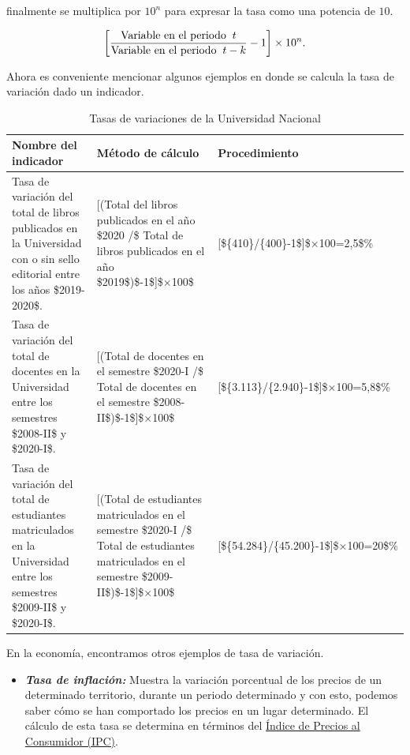 \documentclass[
  11pt,
]{book}
\providecommand{\tightlist}{%
  \setlength{\itemsep}{0pt}\setlength{\parskip}{0pt}}
\begin{document}
finalmente se multiplica por \(10^{n}\) para expresar la tasa como una potencia de \(10\).

\[\begin{equation}
\left[\frac{\text{Variable en el periodo}\hspace{2mm} t}{\text{Variable en el periodo} \hspace{2mm} t-k}-1 \right] \times 10^{n}.
\end{equation}\]

Ahora es conveniente mencionar algunos ejemplos en donde se calcula la tasa de variación dado un indicador.

\begin{table}

\caption{\label{tab:unnamed-chunk-6}Tasas de variaciones de la Universidad Nacional}
\centering
\begin{tabular}[t]{l|l|l}
\hline
Nombre del indicador & Método de cálculo & Procedimiento\\
\hline
Tasa de variación del total de libros publicados en la Universidad con o sin sello editorial entre los años \$2019-2020\$. & [(Total del libros publicados en el año \$2020 /\$ Total de libros publicados en el año \$2019\$)\$-1\$]\$×100\$ & [\$\{410\}/\{400\}-1\$]\$×100=2,5\$\%\\
\hline
Tasa de variación del total de docentes en la Universidad entre los semestres \$2008-II\$ y \$2020-I\$. & [(Total de docentes  en el semestre \$2020-I /\$ Total de docentes en el semestre \$2008-II\$)\$-1\$]\$×100\$ & [\$\{3.113\}/\{2.940\}-1\$]\$×100=5,8\$\%\\
\hline
Tasa de variación del total de estudiantes matriculados en la Universidad entre los semestres \$2009-II\$ y \$2020-I\$. & [(Total de estudiantes matriculados en el semestre \$2020-I /\$ Total de estudiantes matriculados en el semestre \$2009-II\$)\$-1\$]\$×100\$ & [\$\{54.284\}/\{45.200\}-1\$]\$×100=20\$\%\\
\hline
\end{tabular}
\end{table}

En la economía, encontramos otros ejemplos de tasa de variación.

\begin{itemize}
\tightlist
\item
  \textbf{\emph{Tasa de inflación:}} Muestra la variación porcentual de los precios de un determinado territorio, durante un periodo determinado y con esto, podemos saber cómo se han comportado los precios en un lugar determinado. El cálculo de esta tasa se determina en términos del \protect\hyperlink{ipc}{Índice de Precios al Consumidor (IPC)}.
\end{itemize}
\end{document}
